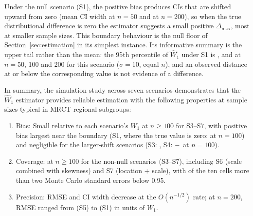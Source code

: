 \documentclass[AMA,Times1COL]{WileyNJDv5}
\begin{document}
Under the null scenario (S1), the positive bias produces CIs that are shifted upward from zero (mean CI width  at $n = 50$ and  at $n = 200$), so when the true distributional difference is zero the estimator suggests a small positive $\Delta_{\max}$, most at smaller sample sizes. This boundary behaviour is the null floor of Section~\ref{sec:estimation} in its simplest instance. Its informative summary is the upper tail rather than the mean: the 95th percentile of $\widehat{W}_1$ under S1 is ,  and  at $n = 50$, 100 and 200 for this scenario ($\sigma = 10$, equal $n$), and an observed distance at or below the corresponding value is not evidence of a difference.

In summary, the simulation study across seven scenarios demonstrates that the $\widehat{W}_1$ estimator provides reliable estimation with the following properties at sample sizes typical in MRCT regional subgroups:
\begin{enumerate}[1.]
\item Bias: Small relative to each scenario's $W_1$ at $n \geq 100$ for S3--S7, with positive bias largest near the boundary (S1, where the true value is zero:  at $n = 100$) and negligible for the larger-shift scenarios (S3: , S4: $-\numval{biasS4n100abs}$ at $n = 100$).
\item Coverage:  at $n \geq 100$ for the non-null scenarios (S3--S7), including S6 (scale combined with skewness) and S7 (location + scale), with  of the ten cells more than two Monte Carlo standard errors below 0.95.
\item Precision: RMSE and CI width decrease at the $O(n^{-1/2})$ rate; at $n = 200$, RMSE ranged from  (S5) to  (S1) in units of $W_1$.
\end{enumerate}
\end{document}
